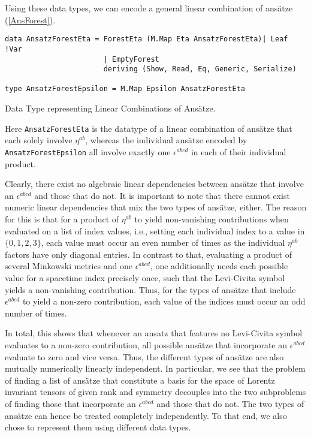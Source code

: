 Using these data types, we can encode a general linear combination of ansätze (\ref{AnsForest}).
\begin{listing}[hbt!] 
\begin{verbatim}
data AnsatzForestEta = ForestEta (M.Map Eta AnsatzForestEta)| Leaf !Var
                       | EmptyForest 
                       deriving (Show, Read, Eq, Generic, Serialize)

type AnsatzForestEpsilon = M.Map Epsilon AnsatzForestEta
\end{verbatim} 
\caption{Data Type representing Linear Combinations of Ansätze.}\label{AnsForest}
\end{listing}
Here \texttt{AnsatzForestEta} is the datatype of a linear combination of ansätze that each solely involve $\eta^{ab}$, whereas the individual ansätze encoded by \texttt{AnsatzForestEpsilon} all involve exactly one $\epsilon^{abcd}$ in each of their individual product.

Clearly, there exist no algebraic linear dependencies between ansätze that involve an $\epsilon^{abcd}$ and those that do not. 
It is important to note that there cannot exist numeric linear dependencies that mix the two types of ansätze, either. The reason for this is that for a product of $\eta^{ab}$ to yield non-vanishing contributions when evaluated on a list of index values, i.e., setting each individual index to a value in $\{0,1,2,3 \}$, each value must occur an even number of times as the individual $\eta^{ab}$ factors have only diagonal entries. In contrast to that, evaluating a product of several Minkowski metrics and one $\epsilon^{abcd}$, one additionally needs each possible value for a spacetime index precisely once, such that the Levi-Civita symbol yields a non-vanishing contribution. Thus, for the types of ansätze that include $\epsilon^{abcd}$ to yield a non-zero contribution, each value of the indices must occur an odd number of times.

In total, this shows that whenever an ansatz that features no Levi-Civita symbol evaluates to a non-zero contribution, all possible ansätze that incorporate an $\epsilon^{abcd}$ evaluate to zero and vice versa. Thus, the different types of ansätze are also mutually numerically linearly independent. In particular, we see that the problem of finding a list of ansätze that constitute a basis for the space of Lorentz invariant tensors of given rank and symmetry decouples into the two subproblems of finding those that incorporate an $\epsilon^{abcd}$ and those that do not. The two types of ansätze can hence be treated completely independently. To that end, we also chose to represent them using different data types. 

